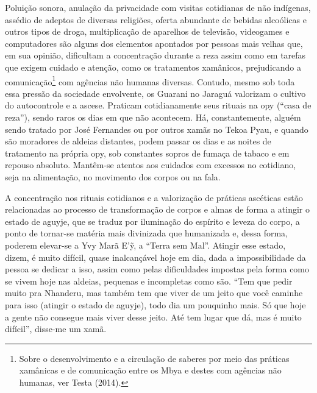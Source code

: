 Poluição sonora, anulação da privacidade com visitas cotidianas de não
indígenas, assédio de adeptos de diversas religiões, oferta abundante
de bebidas alcoólicas e outros tipos de droga, multiplicação de
aparelhos de televisão, videogames e computadores são alguns dos
elementos apontados por pessoas mais velhas que, em sua opinião,
dificultam a concentração durante a reza assim como em tarefas que
exigem cuidado e atenção, como os tratamentos xamânicos, prejudicando a
comunicação\footnote{Sobre o desenvolvimento e a circulação de saberes
por meio das práticas xamânicas e de comunicação entre os Mbya e destes
com agências não humanas, ver Testa (2014).} com agências não humanas
diversas. Contudo, mesmo sob toda essa pressão da sociedade envolvente,
os Guarani no Jaraguá valorizam o cultivo do autocontrole e a ascese.
Praticam cotidianamente seus rituais na opy (``casa de reza''), sendo
raros os dias em que não acontecem. Há, constantemente, alguém sendo
tratado por José Fernandes ou por outros xamãs no Tekoa Pyau, e quando
são moradores de aldeias distantes, podem passar os dias e as noites de
tratamento na própria opy, sob constantes sopros de fumaça de tabaco e
em repouso absoluto. Mantêm-se atentos aos cuidados com excessos no
cotidiano, seja na alimentação, no movimento dos corpos ou na fala.

A concentração nos rituais cotidianos e a valorização de práticas
ascéticas estão relacionadas ao processo de transformação de corpos e
almas de forma a atingir o estado de aguyje, que se traduz por
iluminação do espírito e leveza do corpo, a ponto de tornar-se matéria
mais divinizada que humanizada e, dessa forma, poderem elevar-se a Yvy
Marã E’\~{y}, a ``Terra sem Mal''. Atingir esse estado, dizem, é muito
difícil, quase inalcançável hoje em dia, dada a impossibilidade da
pessoa se dedicar a isso, assim como pelas dificuldades impostas pela
forma como se vivem hoje nas aldeias, pequenas e incompletas como são.
``Tem que pedir muito pra Nhanderu, mas também tem que viver de um jeito
que você caminhe para isso (atingir o estado de aguyje), todo dia um
pouquinho mais. Só que hoje a gente não consegue mais viver desse
jeito. Até tem lugar que dá, mas é muito difícil'', disse-me um xamã.

